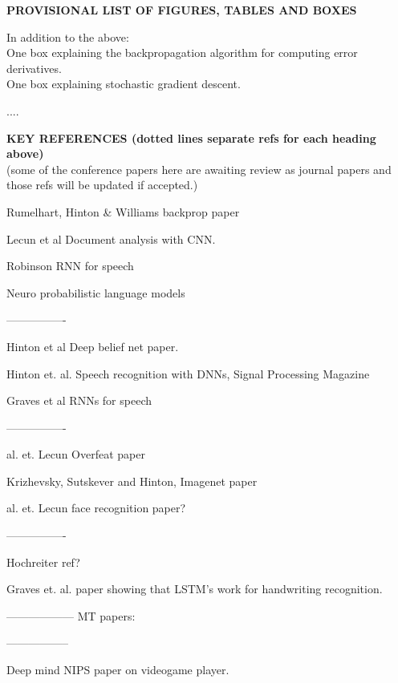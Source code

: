 \documentclass[11pt]{article} %
\begin{document}
{\bf PROVISIONAL LIST OF FIGURES, TABLES AND BOXES}

In addition to the above:\\

One box explaining the backpropagation algorithm for computing error derivatives.\\


One box explaining stochastic gradient descent.


....




{\bf KEY REFERENCES (dotted lines separate refs for each heading above)}\\
(some of the conference papers here are awaiting review as journal papers and those refs will be updated if accepted.)


Rumelhart, Hinton \& Williams backprop paper 
\citep{Rumelhart86b}

Lecun et al Document analysis with CNN.
\citep{LeCun+98}

Robinson RNN for speech
\citep{Robinson+Fallside91}

Neuro probabilistic language models
\citep{BenDucVin01-short}

----------------


Hinton et al  Deep belief net paper.
\citep{Hinton06}

Hinton et. al. Speech recognition with DNNs, Signal Processing Magazine 
\citep{Hinton-et-al-2012}

Graves et al RNNs for speech
\citep{Graves-et-al-ICASSP2013}

----------------


al. et. Lecun  Overfeat paper
\citep{Sermanet14}

Krizhevsky, Sutskever and Hinton, Imagenet paper
\citep{Krizhevsky-2012-small}

al. et. Lecun face recognition paper?
 
----------------


Hochreiter ref?
\citep{Ciresan-2010}

Graves et. al. paper showing that LSTM's work for handwriting recognition.
\citep{Graves-et-al-2009}

------------------
MT papers:

\citep{Devlin-et-al-ACL2014,Bahdanau-et-al-arxiv2014,Sutskever-et-al-arxiv2014}

-----------------


Deep mind NIPS paper on videogame player.
\citep{Deepmind-atari-arxiv2014}




\end{document}
